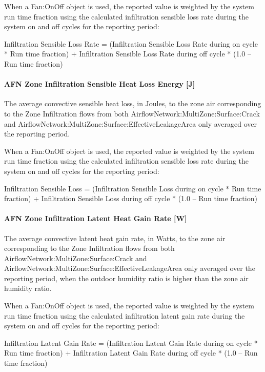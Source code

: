 When a Fan:OnOff object is used, the reported value is weighted by the system run time fraction using the calculated infiltration sensible loss rate during the system on and off cycles for the reporting period:

Infiltration Sensible Loss Rate = (Infiltration Sensible Loss Rate during on cycle * Run time fraction) + Infiltration Sensible Loss Rate during off cycle * (1.0 -- Run time fraction)

\paragraph{AFN Zone Infiltration Sensible Heat Loss Energy {[}J{]}}\label{afn-zone-infiltration-sensible-heat-loss-energy-j}

The average convective sensible heat loss, in Joules, to the zone air corresponding to the Zone Infiltration flows from both AirflowNetwork:MultiZone:Surface:Crack and AirflowNetwork:MultiZone:Surface:EffectiveLeakageArea only averaged over the reporting period.

When a Fan:OnOff object is used, the reported value is weighted by the system run time fraction using the calculated infiltration sensible loss rate during the system on and off cycles for the reporting period:

Infiltration Sensible Loss = (Infiltration Sensible Loss during on cycle * Run time fraction) + Infiltration Sensible Loss during off cycle * (1.0 -- Run time fraction)

\paragraph{AFN Zone Infiltration Latent Heat Gain Rate {[}W{]}}\label{afn-zone-infiltration-latent-heat-gain-rate-w}

The average convective latent heat gain rate, in Watts, to the zone air corresponding to the Zone Infiltration flows from both AirflowNetwork:MultiZone:Surface:Crack and AirflowNetwork:MultiZone:Surface:EffectiveLeakageArea only averaged over the reporting period, when the outdoor humidity ratio is higher than the zone air humidity ratio.

When a Fan:OnOff object is used, the reported value is weighted by the system run time fraction using the calculated infiltration latent gain rate during the system on and off cycles for the reporting period:

Infiltration Latent Gain Rate = (Infiltration Latent Gain Rate during on cycle * Run time fraction) + Infiltration Latent Gain Rate during off cycle * (1.0 -- Run time fraction)

